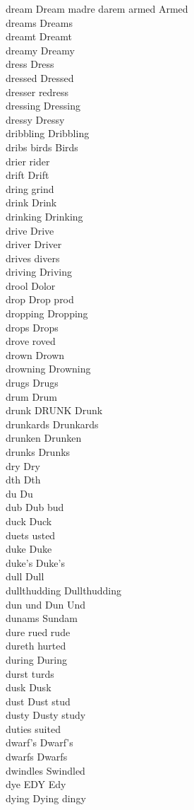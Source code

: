 dream Dream madre darem armed Armed\\
dreams Dreams\\
dreamt Dreamt\\
dreamy Dreamy\\
dress Dress\\
dressed Dressed\\
dresser redress\\
dressing Dressing\\
dressy Dressy\\
dribbling Dribbling\\
dribs birds Birds\\
drier rider\\
drift Drift\\
dring grind\\
drink Drink\\
drinking Drinking\\
drive Drive\\
driver Driver\\
drives divers\\
driving Driving\\
drool Dolor\\
drop Drop prod\\
dropping Dropping\\
drops Drops\\
drove roved\\
drown Drown\\
drowning Drowning\\
drugs Drugs\\
drum Drum\\
drunk DRUNK Drunk\\
drunkards Drunkards\\
drunken Drunken\\
drunks Drunks\\
dry Dry\\
dth Dth\\
du Du\\
dub Dub bud\\
duck Duck\\
duets usted\\
duke Duke\\
duke's Duke's\\
dull Dull\\
dullthudding Dullthudding\\
dun und Dun Und\\
dunams Sundam\\
dure rued rude\\
dureth hurted\\
during During\\
durst turds\\
dusk Dusk\\
dust Dust stud\\
dusty Dusty study\\
duties suited\\
dwarf's Dwarf's\\
dwarfs Dwarfs\\
dwindles Swindled\\
dye EDY Edy\\
dying Dying dingy\\


